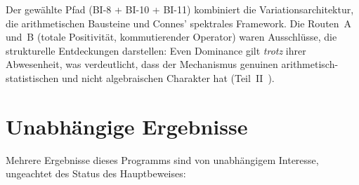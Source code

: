 \documentclass[12pt,a4paper]{article}
\theoremstyle{definition}
\theoremstyle{remark}
\begin{document}
\noindent Der gewählte Pfad (BI-8 + BI-10 + BI-11) kombiniert die
Variationsarchitektur, die arithmetischen Bausteine und Connes'
spektrales Framework. Die Routen~A und~B (totale Positivität,
kommutierender Operator) waren Ausschlüsse, die strukturelle
Entdeckungen darstellen: Even Dominance gilt \emph{trotz} ihrer
Abwesenheit, was verdeutlicht, dass der Mechanismus genuinen
arithmetisch-statistischen und nicht algebraischen Charakter hat
(Teil~II~\cite{Geiger2026partII}).


\section{Unabhängige Ergebnisse}
\label{sec:independent-results}

Mehrere Ergebnisse dieses Programms sind von unabhängigem Interesse,
ungeachtet des Status des Hauptbeweises:
\end{document}
